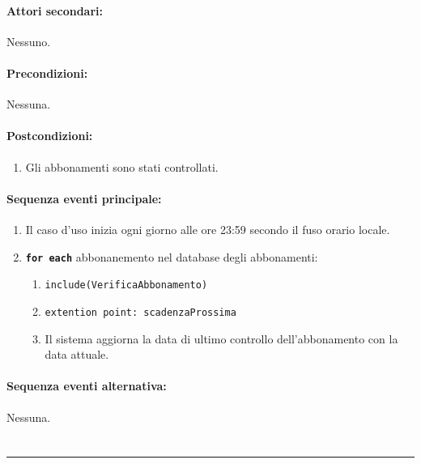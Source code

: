 \documentclass{article}
\begin{document}
	\paragraph{Attori secondari:}Nessuno.
	
	\paragraph{Precondizioni:}Nessuna.
	
	\paragraph{Postcondizioni:}
        \begin{enumerate}	[leftmargin=28pt]
		\item Gli abbonamenti sono stati controllati.
        \end{enumerate}
	
	\paragraph{Sequenza eventi principale:}
\begin{enumerate}[itemsep=8pt,parsep=0pt]
    
    \item
    Il caso d’uso inizia ogni giorno alle ore 23:59 secondo il fuso orario locale.
    
    \item\texttt{\textbf{for each}} abbonanemento nel database degli abbonamenti:
        \begin{enumerate}	[leftmargin=28pt]
			    \item   \texttt{include(VerificaAbbonamento)}
			    \item \texttt{extention point: scadenzaProssima}
			\item Il sistema aggiorna la data di ultimo controllo dell'abbonamento con la data attuale.
                
			    
         \end{enumerate}
	\end{enumerate}
    
	\paragraph{Sequenza eventi alternativa:} Nessuna.
    	
	



	\section*{}
\par\noindent\rule{\textwidth}{0.4pt}
	
\end{document}

